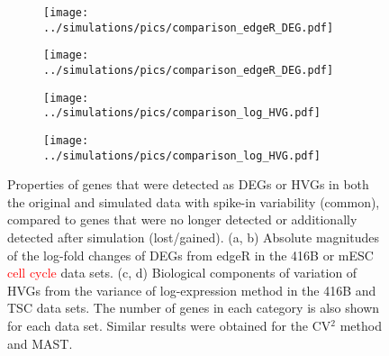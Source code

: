 \documentclass{article}
\newcommand\revised[1]{\textcolor{red}{#1}}
\begin{document}
\begin{figure}[btp]
    \begin{center}
        \begin{subfigure}{0.24\textwidth}
            \texttt{[image: ../simulations/pics/comparison\_edgeR\_DEG.pdf]}
            \caption{}
        \end{subfigure}
        \begin{subfigure}{0.24\textwidth}
            \texttt{[image: ../simulations/pics/comparison\_edgeR\_DEG.pdf]}
            \caption{}
        \end{subfigure}
        \begin{subfigure}{0.24\textwidth}
            \texttt{[image: ../simulations/pics/comparison\_log\_HVG.pdf]}
            \caption{}
        \end{subfigure}
        \begin{subfigure}{0.24\textwidth}
            \texttt{[image: ../simulations/pics/comparison\_log\_HVG.pdf]}
            \caption{}
        \end{subfigure}
    \end{center}
    \caption{Properties of genes that were detected as DEGs or HVGs in both the original and simulated data with spike-in variability (common), compared to genes that were no longer detected or additionally detected after simulation (lost/gained).
    (a, b) Absolute magnitudes of the log-fold changes of DEGs from edgeR in the 416B or mESC \revised{cell cycle} data sets.
    (c, d) Biological components of variation of HVGs from the variance of log-expression method in the 416B and TSC data sets.
    The number of genes in each category is also shown for each data set.
    Similar results were obtained for the CV$^2$ method and MAST.
    }
\end{figure}
\end{document}
